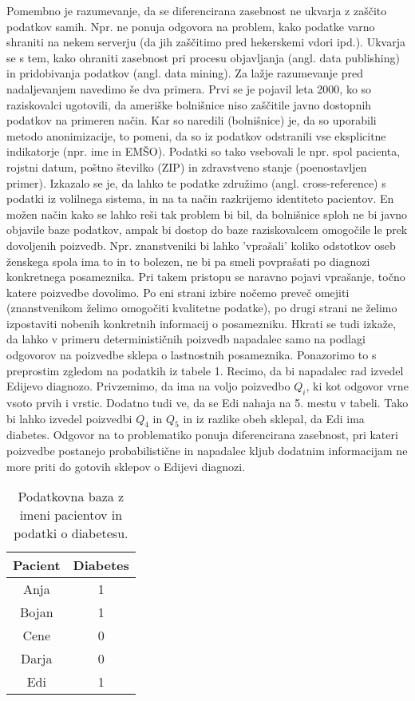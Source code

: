 \documentclass[12pt,a4paper]{amsart}
\theoremstyle{definition} %
\theoremstyle{plain} %
\begin{document}
Pomembno je razumevanje, da se diferencirana zasebnost ne ukvarja z zaščito podatkov samih. Npr. ne ponuja odgovora na problem, kako podatke varno shraniti na nekem serverju (da jih zaščitimo pred hekerskemi vdori ipd.). Ukvarja se s tem, kako ohraniti zasebnost pri procesu objavljanja (angl. data publishing) in pridobivanja podatkov (angl. data mining). Za lažje razumevanje pred nadaljevanjem navedimo še dva primera. Prvi se je pojavil leta 2000, ko so raziskovalci ugotovili, da ameriške bolnišnice niso zaščitile javno dostopnih podatkov na primeren način. Kar so naredili (bolnišnice) je, da so uporabili metodo anonimizacije, to pomeni, da so iz podatkov odstranili vse eksplicitne indikatorje (npr. ime in EMŠO). Podatki so tako vsebovali le npr. spol pacienta, rojstni datum, poštno številko (ZIP) in zdravstveno stanje (poenostavljen primer). Izkazalo se je, da lahko te podatke združimo (angl. cross-reference) s podatki iz volilnega sistema, in na ta način razkrijemo identiteto pacientov. En možen način kako se lahko reši tak problem bi bil, da bolnišnice sploh ne bi javno objavile baze podatkov, ampak bi dostop do baze raziskovalcem omogočile le prek dovoljenih poizvedb. Npr. znanstveniki bi lahko 'vprašali' koliko odstotkov oseb ženskega spola ima to in to bolezen, ne bi pa smeli povprašati po diagnozi konkretnega posameznika. Pri takem pristopu se naravno pojavi vprašanje, točno katere poizvedbe dovolimo. Po eni strani izbire nočemo preveč omejiti (znanstvenikom želimo omogočiti kvalitetne podatke), po drugi strani ne želimo izpostaviti nobenih konkretnih informacij o posamezniku. Hkrati se tudi izkaže, da lahko v primeru determinističnih poizvedb napadalec samo na podlagi odgovorov na poizvedbe sklepa o lastnostnih posameznika. Ponazorimo to s preprostim zgledom na podatkih iz tabele 1. Recimo, da bi napadalec rad izvedel Edijevo diagnozo. Privzemimo, da ima na voljo poizvedbo $Q_i$, ki kot odgovor vrne vsoto prvih i vrstic. Dodatno tudi ve, da se Edi nahaja na 5. mestu v tabeli. Tako bi lahko izvedel poizvedbi $Q_4$ in $Q_5$ in iz razlike obeh sklepal, da Edi ima diabetes.  Odgovor na to problematiko ponuja diferencirana zasebnost, pri kateri poizvedbe postanejo probabilistične in napadalec kljub dodatnim informacijam ne more priti do gotovih sklepov o Edijevi diagnozi.
\begin{table}
\begin{center}
 \begin{tabular}{| c | c |} 
 \hline
 \textbf{Pacient} & \textbf{Diabetes}  \\ [0.5ex] 
 \hline
 Anja & 1  \\ 
 \hline
 Bojan & 1\\
 \hline
 Cene & 0 \\
 \hline
 Darja & 0  \\
 \hline
 Edi & 1  \\  
 \hline
\end{tabular}
\caption{Podatkovna baza z imeni pacientov in podatki o diabetesu.}
\end{center}
\end{table}
\end{document}
